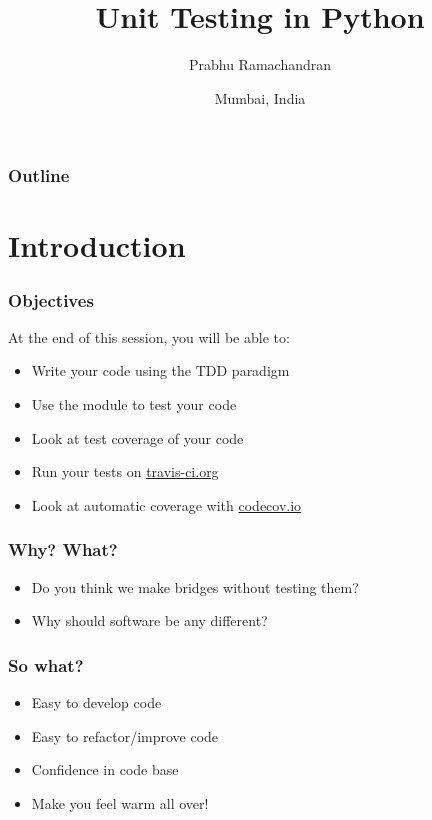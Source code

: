 \documentclass[14pt,compress]{beamer}
\title[Testing]{Unit Testing in Python}
\author[FOSSEE] {Prabhu Ramachandran}
\institute[FOSSEE -- IITB] {Department of Aerospace Engineering\\IIT Bombay}
\date[] {Mumbai, India}
\begin{document}
\begin{frame}
  \titlepage
\end{frame}

\begin{frame}
  \frametitle{Outline}
  \tableofcontents
\end{frame}

\section{Introduction}

\begin{frame}
  \frametitle{Objectives}
  At the end of this session, you will be able to:
  \begin{itemize}
  \item Write your code using the TDD paradigm
  \item Use the  module to test your code
  \item Look at test coverage of your code
  \item Run your tests on \url{travis-ci.org}
  \item Look at automatic coverage with \url{codecov.io}
  \end{itemize}
\end{frame}

\begin{frame}
  \frametitle{Why?  What?}
  \begin{itemize}
  \item Do you think we make bridges without testing them?
    \pause
    \vspace*{1in}
  \item Why should software be any different?
  \end{itemize}
\end{frame}

\begin{frame}
  \frametitle{So what?}
  \begin{itemize}
  \item Easy to develop code
  \item Easy to refactor/improve code
  \item Confidence in code base
  \item Make you feel warm all over!
  \end{itemize}
\end{frame}
\end{document}
